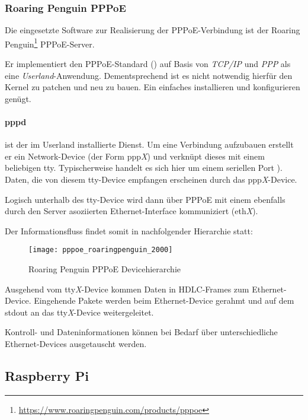 \subsubsection{Roaring Penguin PPPoE}
Die eingesetzte Software zur Realisierung der PPPoE-Verbindung ist der
Roaring Penguin\footnote{\url{https://www.roaringpenguin.com/products/pppoe}} PPPoE-Server.

Er implementiert den PPPoE-Standard () auf Basis
von \textit{TCP/IP} und \textit{PPP} als eine \textit{Userland}-Anwendung.
Dementsprechend ist es nicht notwendig hierfür den Kernel zu patchen und neu zu bauen.
Ein einfaches installieren und konfigurieren genügt.

\paragraph{pppd}
ist der im Userland installierte Dienst. Um eine Verbindung aufzubauen
erstellt er ein Network-Device (der Form ppp\textit{X}) und verknüpt dieses
mit einem beliebigen tty.
Typischerweise handelt es sich hier um einem seriellen Port \cite{roaringpenguinpres}).
Daten, die von diesem tty-Device empfangen erscheinen durch das ppp\textit{X}-Device.

Logisch unterhalb des tty-Device wird dann über PPPoE mit einem ebenfalls durch den Server
asoziierten Ethernet-Interface kommuniziert (eth\textit{X}).

Der Informationsfluss findet somit in nachfolgender Hierarchie statt:
 \begin{figure}[htp]
  \begin{center}
   \texttt{[image: pppoe\_roaringpenguin\_2000]}
  \end{center}
  \caption[Roaring Penguin PPPoE Devicehierarchie]{Roaring Penguin PPPoE Devicehierarchie \cite{roaringpenguinpres}}
  \label{fig:pppoe_roaringpenguin_devicehierarchy}
 \end{figure}

Ausgehend vom tty\textit{X}-Device kommen Daten in \ac{HDLC}-Frames zum Ethernet-Device.
Eingehende Pakete werden beim Ethernet-Device gerahmt und auf dem stdout an
das tty\textit{X}-Device weitergeleitet.

Kontroll- und Dateninformationen können bei Bedarf über unterschiedliche
Ethernet-Devices ausgetauscht werden.

\subsection{Raspberry Pi}

